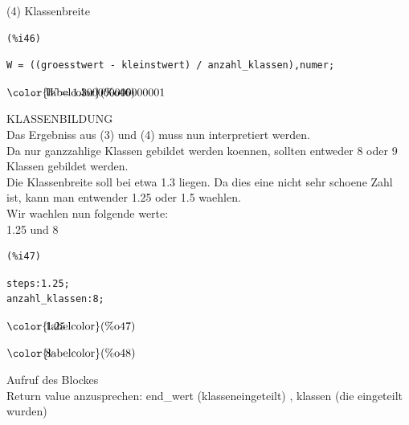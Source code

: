 \documentclass[12pt]{article}
\begin{document}
(4)
Klassenbreite

\noindent
\begin{minipage}[t]{8ex}{\color{red}\bf
\begin{verbatim}
(%i46) 
\end{verbatim}}
\end{minipage}
\begin{minipage}[t]{\textwidth}{\color{blue}
\begin{verbatim}
W = ((groesstwert - kleinstwert) / anzahl_klassen),numer;
\end{verbatim}}
\end{minipage}
\begin{math}\displaystyle
\parbox{8ex}{\color{labelcolor}(\%o46) }
W=1.300000000000001
\end{math}

KLASSENBILDUNG \\
Das Ergebniss aus (3) und (4) muss nun interpretiert werden. \\
Da nur ganzzahlige Klassen gebildet werden koennen, sollten entweder 8 oder 9 Klassen gebildet werden.\\
Die Klassenbreite soll bei etwa 1.3 liegen. Da dies eine nicht sehr schoene Zahl ist, kann man entwender 1.25 oder 1.5 waehlen. \\
Wir waehlen nun folgende werte: \\
1.25 und 8

\noindent
\begin{minipage}[t]{8ex}{\color{red}\bf
\begin{verbatim}
(%i47) 
\end{verbatim}}
\end{minipage}
\begin{minipage}[t]{\textwidth}{\color{blue}
\begin{verbatim}
steps:1.25;
anzahl_klassen:8;
\end{verbatim}}
\end{minipage}
\begin{math}\displaystyle
\parbox{8ex}{\color{labelcolor}(\%o47) }
1.25
\end{math}

\begin{math}\displaystyle
\parbox{8ex}{\color{labelcolor}(\%o48) }
8
\end{math}

Aufruf des Blockes \\
Return value anzusprechen: end\_wert (klasseneingeteilt) , klassen (die eingeteilt wurden)
\end{document}
